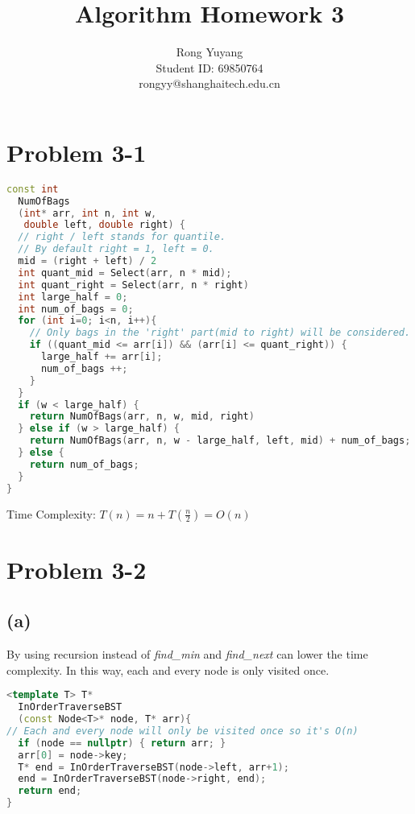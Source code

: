 \documentclass{article}
\title{Algorithm Homework 3}
\author{Rong Yuyang \\ Student ID: 69850764 \\ rongyy@shanghaitech.edu.cn}
\begin{document}
\maketitle

\section*{Problem 3-1}
\begin{lstlisting}[language = C++]
const int 
  NumOfBags
  (int* arr, int n, int w, 
   double left, double right) {
  // right / left stands for quantile.
  // By default right = 1, left = 0.
  mid = (right + left) / 2
  int quant_mid = Select(arr, n * mid);
  int quant_right = Select(arr, n * right)
  int large_half = 0;
  int num_of_bags = 0;
  for (int i=0; i<n, i++){
    // Only bags in the 'right' part(mid to right) will be considered.
    if ((quant_mid <= arr[i]) && (arr[i] <= quant_right)) {
      large_half += arr[i];
      num_of_bags ++;
    }
  }
  if (w < large_half) {
    return NumOfBags(arr, n, w, mid, right)
  } else if (w > large_half) {
    return NumOfBags(arr, n, w - large_half, left, mid) + num_of_bags;
  } else {
    return num_of_bags;
  }
}
\end{lstlisting}  
Time Complexity: $T(n) = n + T(\frac{n}{2}) = O(n)$
\section*{Problem 3-2}
  \subsection*{(a)}
  By using recursion instead of \textit{find\_min} and \textit{find\_next} can lower the time complexity. In this way, each and every node is only visited once.
\begin{lstlisting}[language = C++]
<template T> T*
  InOrderTraverseBST
  (const Node<T>* node, T* arr){
// Each and every node will only be visited once so it's O(n)
  if (node == nullptr) { return arr; }
  arr[0] = node->key;
  T* end = InOrderTraverseBST(node->left, arr+1);
  end = InOrderTraverseBST(node->right, end);
  return end;
}
\end{lstlisting}   
\end{document}
